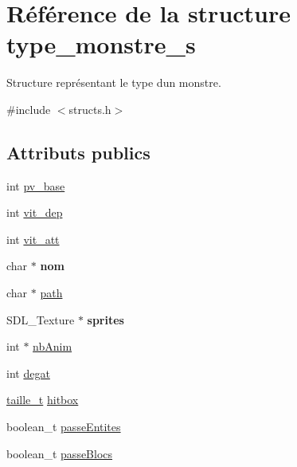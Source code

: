 \hypertarget{structtype__monstre__s}{}\section{Référence de la structure type\+\_\+monstre\+\_\+s}
\label{structtype__monstre__s}


Structure représentant le type d\textquotesingle{}un monstre.  




{\ttfamily \#include $<$structs.\+h$>$}

\subsection*{Attributs publics}
\begin{DoxyCompactItemize}
\item 
int \hyperlink{structtype__monstre__s_a37d1cae3dfb8de6ce15f2601a93cd1cc}{pv\+\_\+base}
\item 
int \hyperlink{structtype__monstre__s_a768470695da3d9377f1e7e97a3c45ed7}{vit\+\_\+dep}
\item 
int \hyperlink{structtype__monstre__s_a5bb66d5b722fc97f901c5eaf7d621fd4}{vit\+\_\+att}
\item 
\mbox{\label{structtype__monstre__s_a18520dadfa451022be8dd63b86a1943c}} 
char $\ast$ {\bfseries nom}
\item 
char $\ast$ \hyperlink{structtype__monstre__s_ad507cb527c078d7a5c565b67d842e968}{path}
\item 
\mbox{\label{structtype__monstre__s_ac1a86f0c67aba51892c613210e3de1be}} 
S\+D\+L\+\_\+\+Texture $\ast$ {\bfseries sprites}
\item 
int $\ast$ \hyperlink{structtype__monstre__s_aecf18b6fa00e710fe27de2d1b738e62c}{nb\+Anim}
\item 
int \hyperlink{structtype__monstre__s_aa3e5568720dc977348e6929f3df5260c}{degat}
\item 
\hyperlink{structtaille__s}{taille\+\_\+t} \hyperlink{structtype__monstre__s_ac0afaa340c029c12a6939d4b09fd3966}{hitbox}
\item 
boolean\+\_\+t \hyperlink{structtype__monstre__s_a03f34ddaadae9f002130e70844f142f1}{passe\+Entites}
\item 
boolean\+\_\+t \hyperlink{structtype__monstre__s_a0f60370f9ae95fff9ab024fbf6485df6}{passe\+Blocs}
\end{DoxyCompactItemize}


